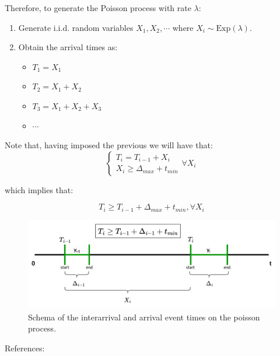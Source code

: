\documentclass{article}
\begin{document}
\begin{itemize}
    Therefore, to generate the Poisson process with rate $\lambda$:
    \begin{enumerate}
      \item Generate i.i.d. random variables $X_1, X_2, \cdots$ where $X_i \sim \text{Exp}(\lambda)$.
      \item Obtain the arrival times as:
        \begin{itemize}
          \item $T_1 = X_1$
          \item $T_2 = X_1 + X_2$
          \item $T_3 = X_1 + X_2 + X_3$
          \item $\cdots$
        \end{itemize}
    \end{enumerate}

    Note that, having imposed the previous we will have that:
    \begin{equation}
      \begin{cases}
        T_i = T_{i-1} + X_i \\
        X_i \geq \Delta_{max} + t_{min}
      \end{cases}\forall X_i \
    \end{equation}

    which implies that:
    
    \begin{equation}
      T_i \geq T_{i-1} + \Delta_{max} + t_{min}, \forall X_i
    \end{equation}
    
\end{itemize}
\begin{figure}[H]
    \centering
    \includegraphics[scale=0.55]{images/tx-generation-dist-corrected.png}
    \caption{Schema of the interarrival and arrival event times on the poisson process.}
\end{figure}


References:
\end{document}
